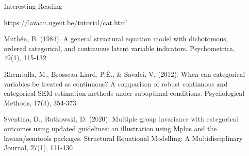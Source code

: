 \documentclass[10pt]{beamer}\usepackage[]{graphicx}\usepackage[]{xcolor}
\begin{document}

%	
%	
%


\begin{frame}{Interesting Reading}
	
	https://lavaan.ugent.be/tutorial/cat.html
	
	\vspace{5mm}
	
	Muthén, B. (1984). A general structural equation model with dichotomous, ordered categorical, and continuous latent variable indicators. Psychometrica, 49(1), 115-132.
	
	\vspace{5mm}
	
	Rhemtulla, M., Brosseau-Liard, P.É., \& Savalei, V. (2012). When can categorical variables be treated as continuous? A comparison of robust continuous and categorical SEM estimation methods under suboptimal conditions. Psychological Methods, 17(3), 354-373. 
	
	\vspace{5mm}
	
	Sventina, D., Rutkowski, D. (2020). Multiple group invariance with categorical outcomes using updated guidelines: an illustration using Mplus and the lavaan/semtools packages. Structural Equational Modelling: A Multidisciplinary Journal, 27(1), 111-130

\end{frame}


%
%
\end{document}
